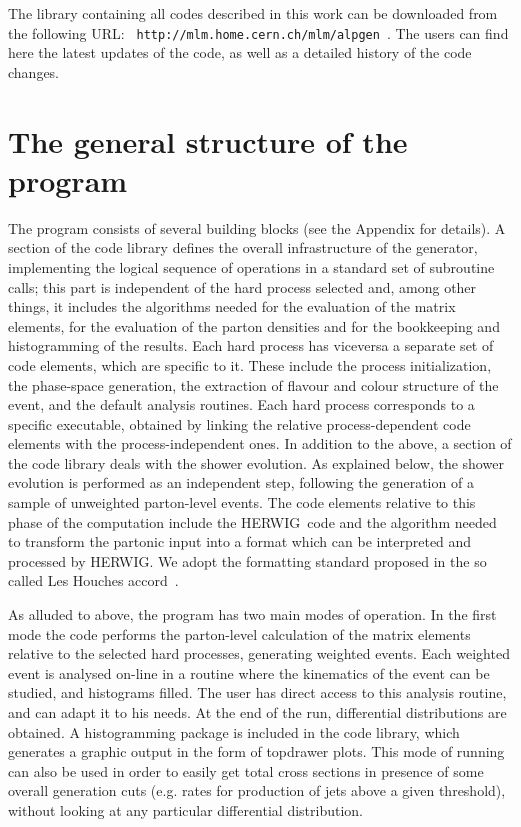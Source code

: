 \documentclass[paper]{JHEP3}
\def\herwig{{\small HERWIG}}
\begin{document}
The library containing all codes described in this work can be
downloaded from the following URL: {\tt
  http://mlm.home.cern.ch/mlm/alpgen} \,.
The users can find here the latest updates of the code, as well as a
detailed history of the code changes.

\section{The general structure of the program}
\label{sec:general}
The program consists of several building blocks (see the Appendix for
details). A section of the code library defines the overall
infrastructure of the generator, implementing the logical sequence of
operations in a standard set of subroutine calls; this part is
independent of the hard process selected and, among other things, it
includes the algorithms needed for the evaluation of the matrix
elements, for the evaluation of the parton densities and for the
bookkeeping and histogramming of the results.  Each hard process has
viceversa a separate set of code elements, which are specific to it.
These include the process initialization, the phase-space generation,
the extraction of flavour and colour structure of the event, and the
default analysis routines.  Each hard process corresponds to a
specific executable, obtained by linking the relative
process-dependent code elements with the process-independent ones.  In
addition to the above, a section of the code library deals with the
shower evolution. As explained below, the shower evolution is
performed as an independent step, following the generation of a sample
of unweighted parton-level events. The code elements relative to this
phase of the computation include the \herwig\ code and the algorithm
needed to transform the partonic input into a format which can be
interpreted and processed by \herwig. We adopt the formatting standard
proposed in the so called Les Houches accord~\cite{Boos:2001cv}.  

As alluded to above, the program has two main modes of operation. In the
first mode the code performs the parton-level calculation of the matrix
elements relative to the selected hard processes, generating weighted
events.  Each weighted event is analysed on-line in a routine where
the kinematics of the event can be studied, and histograms filled. The
user has direct access to this analysis routine, and can adapt it to
his needs.  At the end of the run, differential distributions are
obtained. A histogramming package is included in the code library,
which generates a graphic output in the form of topdrawer plots.
This mode of running can also be used in order to easily get total
cross sections in presence of some overall generation cuts (e.g. rates
for production of jets above a given threshold), without looking at
any particular differential distribution.
\end{document}
